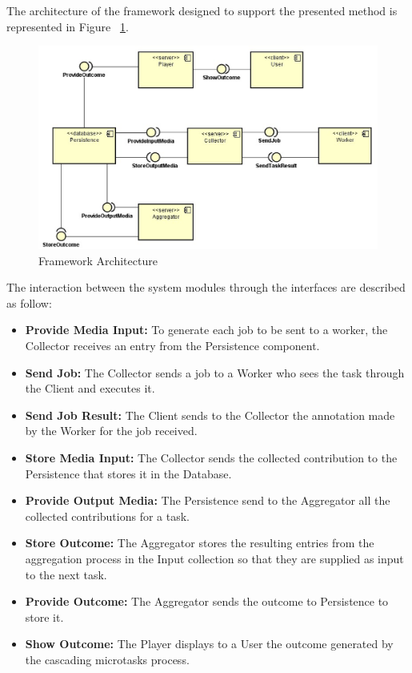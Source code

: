 The architecture of the framework designed to support the presented method is represented in Figure ~\ref{architecture}.

\begin{figure}[h!]
	\centerline{\includegraphics[scale=0.25] {figure/system}}
	\caption{Framework Architecture}
	\label{architecture}
\end{figure}

The interaction between the system modules through the interfaces are described as follow:
\begin{itemize}
\item \textbf{Provide Media Input:} To generate each job to be sent to a worker, the Collector receives an entry from the Persistence component.

\item \textbf{Send Job:} The Collector sends a job to a Worker who sees the task through the Client and executes it.

\item \textbf{Send Job Result:} The Client sends to the Collector the annotation made by the Worker for the job received.

\item \textbf{Store Media Input:} The Collector sends the collected contribution to the Persistence that stores it in the Database.

\item \textbf{Provide Output Media:} The Persistence send to the Aggregator all the collected contributions for a task.

\item \textbf{Store Outcome:} The Aggregator stores the resulting entries from the aggregation process in the Input collection so that they are supplied as input to the next task.

\item \textbf{Provide Outcome:} The Aggregator sends the outcome to Persistence to store it.

\item \textbf{Show Outcome:} The Player displays to a User the outcome generated by the cascading microtasks process.

\end{itemize}

